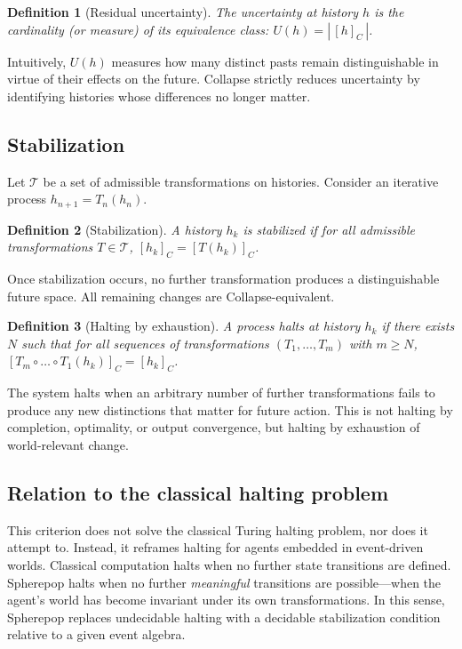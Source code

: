 \documentclass[11pt]{article}
\newtheorem{definition}{Definition}
\begin{document}
\begin{definition}[Residual uncertainty]
The uncertainty at history $h$ is the cardinality (or measure) of its
equivalence class: $U(h) = |\,[h]_C\,|$.
\end{definition}

Intuitively, $U(h)$ measures how many distinct pasts remain distinguishable in
virtue of their effects on the future. Collapse strictly reduces uncertainty by
identifying histories whose differences no longer matter.

\subsection{Stabilization}

Let $\mathcal{T}$ be a set of admissible transformations on histories. Consider
an iterative process $h_{n+1} = T_n(h_n)$.

\begin{definition}[Stabilization]
A history $h_k$ is stabilized if for all admissible transformations
$T \in \mathcal{T}$, $[h_k]_C = [T(h_k)]_C$.
\end{definition}

Once stabilization occurs, no further transformation produces a distinguishable
future space. All remaining changes are Collapse-equivalent.

\begin{definition}[Halting by exhaustion]
A process halts at history $h_k$ if there exists $N$ such that for all
sequences of transformations $(T_1, \dots, T_m)$ with $m \ge N$,
$[T_m \circ \dots \circ T_1 (h_k)]_C = [h_k]_C$.
\end{definition}

The system halts when an arbitrary number of further transformations fails to
produce any new distinctions that matter for future action. This is not halting
by completion, optimality, or output convergence, but halting by exhaustion of
world-relevant change.

\subsection{Relation to the classical halting problem}

This criterion does not solve the classical Turing halting problem, nor does it
attempt to. Instead, it reframes halting for agents embedded in event-driven
worlds. Classical computation halts when no further state transitions are
defined. Spherepop halts when no further \emph{meaningful} transitions are
possible---when the agent's world has become invariant under its own
transformations. In this sense, Spherepop replaces undecidable halting with a
decidable stabilization condition relative to a given event algebra.
\end{document}
